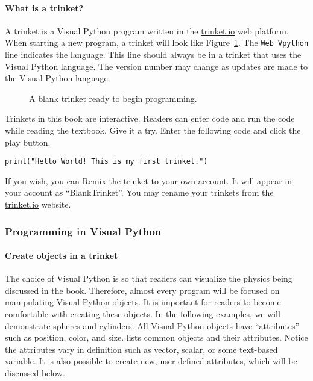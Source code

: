 \paragraph{What is a trinket?}

A trinket is a Visual Python program written in the \href{http://trinket.io}{trinket.io} web platform. When starting a new program, a trinket will look like Figure~\ref{app:visualpython:blanktrinket}. The \texttt{Web Vpython} line indicates the language. This line should always be in a trinket that uses the Visual Python language. The version number may change as updates are made to the Visual Python language.

\begin{figure}[!htbp]
\centering
\caption[]{A blank trinket ready to begin programming.}
\label{app:visualpython:blanktrinket}
\end{figure}

Trinkets in this book are interactive. Readers can enter code and run the code while reading the textbook. Give it a try. Enter the following code and click the play button.

\begin{verbatim}
print("Hello World! This is my first trinket.")
\end{verbatim}

If you wish, you can Remix the trinket to your own account. It will appear in your account as ``BlankTrinket''. You may rename your trinkets from the \href{http://trinket.io}{trinket.io} website.

\subsubsection{Programming in Visual Python}

\paragraph{Create objects in a trinket}

The choice of Visual Python is so that readers can visualize the physics being discussed in the book. Therefore, almost every program will be focused on manipulating Visual Python objects. It is important for readers to become comfortable with creating these objects. In the following examples, we will demonstrate spheres and cylinders. All Visual Python objects have ``attributes'' such as position, color, and size. \href{\#tab:visualpython:objattrs}{} lists common objects and their attributes. Notice the attributes vary in definition such as vector, scalar, or some text-based variable. It is also possible to create new, user-defined attributes, which will be discussed below.

